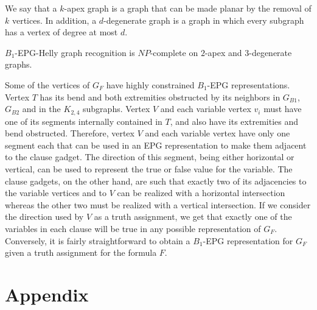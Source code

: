 \documentclass[runningheads]{llncs}
\begin{document}
We say that a $k$-apex graph is a graph that can be made planar by the removal of $k$ vertices. In addition, a $d$-degenerate graph is a graph in which every subgraph has a vertex of degree at most $d$.

\begin{corollary}\label{coro:2apexAnd3degenerate}
{\sc $B_{1}$-EPG-Helly graph recognition} is $NP$-complete on $2$-apex and $3$-degenerate graphs.
\end{corollary}

Some of the vertices of $G_F$ have highly constrained $B_1$-EPG representations. Vertex $T$ has its bend	and both extremities	obstructed	by its neighbors in	$G_{B1}$, $G_{B2}$ and in the $K_{2,4}$
subgraphs. Vertex $V$ and each variable vertex $v_i$ must have one of its segments internally contained in $T$, and also have its extremities and bend obstructed.  Therefore, vertex $V$ and each
variable vertex have only one segment each that can be used in an EPG
representation to make them adjacent to the clause gadget. The direction of
this segment, being either horizontal	or vertical, can be used to represent
the true or false value	for the	variable.
The clause gadgets, on the other hand, are such that exactly two of its
adjacencies to the variable vertices and to $V$ can be realized with a
horizontal intersection whereas  the other two must be realized with a
vertical intersection. If we consider the direction used by $V$ as a
truth assignment, we get that exactly one of the variables in each clause
will be	true in	any possible representation of $G_F$. Conversely, it is	fairly
straightforward to obtain a $B_1$-EPG representation for $G_F$ given a truth assignment	for
the formula $F$.







\newpage

\section*{Appendix}
\end{document}
